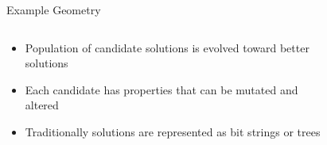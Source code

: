 \begin{frame}{Example Geometry}
\begin{columns}[onlytextwidth]
  \begin{column}{0.45\textwidth}
    \small
    \begin{itemize}
      \item Population of candidate solutions is evolved toward better solutions
      \item Each candidate has properties that can be mutated and altered
      \item Traditionally solutions are represented as bit strings or trees
    \end{itemize}
    \end{column}
  \begin{column}{0.45\textwidth}
    \begin{figure}
		\tiny
    \end{figure}
  \end{column}
\end{columns}
\hyperlink{GAMethodExtended}{}
\end{frame}

